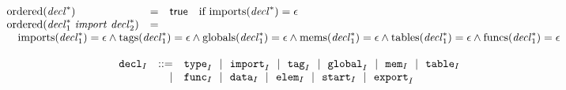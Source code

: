 $$
\begin{array}[t]{@{}lcl@{}l@{}}
{\mathrm{ordered}}({{\mathit{decl}}^\ast}) & = & \mathsf{true} & \quad \mbox{if}~ {\mathrm{imports}}({{\mathit{decl}}^\ast}) = \epsilon \\
{\mathrm{ordered}}({{\mathit{decl}}_1^\ast}~{\mathit{import}}~{{\mathit{decl}}_2^\ast}) & = & & \\
 \multicolumn{4}{@{}l@{}}{\quad
\begin{array}[t]{@{}l@{}}
{\mathrm{imports}}({{\mathit{decl}}_1^\ast}) = \epsilon \land {\mathrm{tags}}({{\mathit{decl}}_1^\ast}) = \epsilon \land {\mathrm{globals}}({{\mathit{decl}}_1^\ast}) = \epsilon \land {\mathrm{mems}}({{\mathit{decl}}_1^\ast}) = \epsilon \land {\mathrm{tables}}({{\mathit{decl}}_1^\ast}) = \epsilon \land {\mathrm{funcs}}({{\mathit{decl}}_1^\ast}) = \epsilon \\
\end{array}
} \\
\end{array}
$$

\vspace{1ex}

$$
\begin{array}[t]{@{}lrrl@{}l@{}l@{}l@{}}
& {{\mathtt{decl}}}_{I} & ::= & {{\mathtt{type}}}_{I} ~~|~~ {{\mathtt{import}}}_{I} ~~|~~ {{\mathtt{tag}}}_{I} ~~|~~ {{\mathtt{global}}}_{I} ~~|~~ {{\mathtt{mem}}}_{I} ~~|~~ {{\mathtt{table}}}_{I} \\
& & | & {{\mathtt{func}}}_{I} ~~|~~ {{\mathtt{data}}}_{I} ~~|~~ {{\mathtt{elem}}}_{I} ~~|~~ {{\mathtt{start}}}_{I} ~~|~~ {{\mathtt{export}}}_{I} \\
\end{array}
$$

\vspace{1ex}

